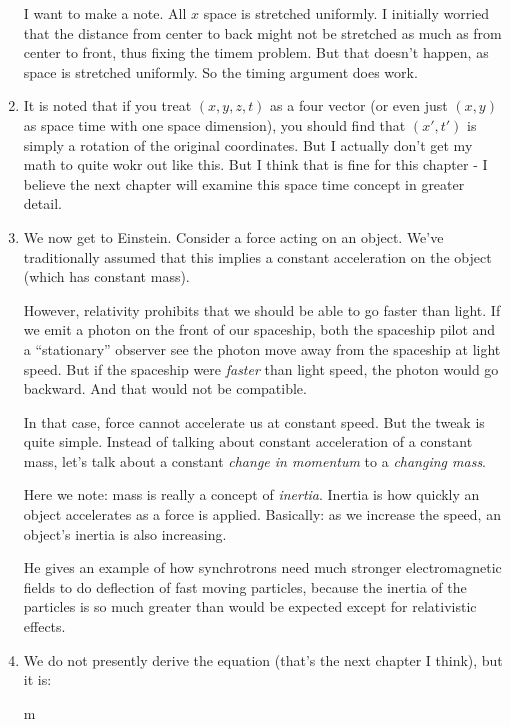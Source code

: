 \begin{enumerate}
  I want to make a note. All $x$ space is stretched uniformly. I
  initially worried that the distance from center to back might not be
  stretched as much as from center to front, thus fixing the timem
  problem. But that doesn't happen, as space is stretched uniformly. So
  the timing argument does work.

  \item It is noted that if you treat $(x, y, z, t)$ as a four vector
  (or even just $(x, y)$ as space time with one space dimension), you
  should find that $(x', t')$ is simply a rotation of the original
  coordinates. But I actually don't get my math to quite wokr out like
  this. But I think that is fine for this chapter - I believe the next
  chapter will examine this space time concept in greater detail.

  \item We now get to Einstein. Consider a force acting on an object.
  We've traditionally assumed that this implies a constant acceleration
  on the object (which has constant mass).

  However, relativity prohibits that we should be able to go faster than
  light. If we emit a photon on the front of our spaceship, both the
  spaceship pilot and a ``stationary'' observer see the photon move away
  from the spaceship at light speed. But if the spaceship were
  \emph{faster} than light speed, the photon would go backward. And that
  would not be compatible.

  In that case, force cannot accelerate us at constant speed. But the
  tweak is quite simple. Instead of talking about constant acceleration
  of a constant mass, let's talk about a constant \emph{change in
  momentum} to a \emph{changing mass}.

  Here we note: mass is really a concept of \emph{inertia}. Inertia is
  how quickly an object accelerates as a force is applied. Basically: as
  we increase the speed, an object's inertia is also increasing.

  He gives an example of how synchrotrons need much stronger
  electromagnetic fields to do deflection of fast moving particles,
  because the inertia of the particles is so much greater than would be
  expected except for relativistic effects.

  \item We do not presently derive the equation (that's the next chapter
  I think), but it is:

  \begin{nedqn}
    m
  \eqcol
  \end{nedqn}


\end{enumerate}
